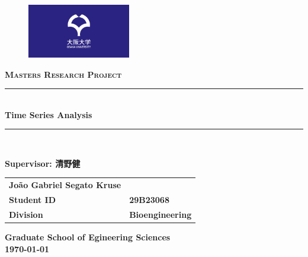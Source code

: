 \documentclass[../main.tex]{subfiles}
\begin{document}
    \title{ }
    \begin{titlepage}
    \date{\vspace{-5ex}}
    \newcommand{\HRule}{\rule{\linewidth}{0.5mm}}
    
    \center
    
    \begin{figure}
        \centering
        \includegraphics[width=0.4\textwidth]{images/logo_osaka.png}
    \end{figure}
    
    \textsc{\textbf{\Large Masters Research Project}}\\[0.5cm]
    
    \vspace{1.0cm}
    
    \HRule \\[0.4cm]
    { \large \textbf{Time Series Analysis}}\\[0.25cm]
    \HRule \\[1.0cm]
    
    \vspace{1.0cm}
    
    \textbf{\large Supervisor: 清野健}\\
    
    \vspace{0.5cm}
    
    \begin{flushright}
        \begin{tabular}{@{}ll@{}}
            \hspace{.5cm} \textbf{\large João Gabriel Segato Kruse}\\
            \hspace{.5cm} \textbf{Student ID} & \textbf{29B23068}\\
            \hspace{.5cm} \textbf{Division} & \textbf{Bioengineering}
        \end{tabular}
    \end{flushright}
    \vfill
    {\textbf{\large Graduate School of Egineering Sciences}\\ \vspace{0.5cm}\textbf{\monthyeardate\today}}\\[2cm]
    \end{titlepage}

    \pagestyle{fancy}
    \maketitle
\end{document}
